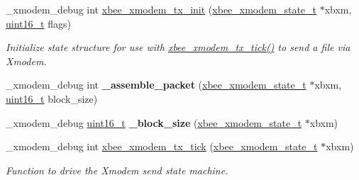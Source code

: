 \begin{DoxyCompactItemize}
\item 
\-\_\-xmodem\-\_\-debug int \hyperlink{group__util__xmodem_gabc8da474bce7043eef3537bd492c5123}{xbee\-\_\-xmodem\-\_\-tx\-\_\-init} (\hyperlink{structxbee__xmodem__state__t}{xbee\-\_\-xmodem\-\_\-state\-\_\-t} $\ast$xbxm, \hyperlink{group__hal_ga5a8b2dc9e45a9ee81a94ef304fb62505}{uint16\-\_\-t} flags)
\begin{DoxyCompactList}\small\item\em Initialize state structure for use with \hyperlink{group__util__xmodem_ga1de6d8cc3628767d877e854f92ab2b0e}{xbee\-\_\-xmodem\-\_\-tx\-\_\-tick()} to send a file via Xmodem. \end{DoxyCompactList}\item 
\hypertarget{group__util__xmodem_ga96fca6132d78345b4a3c20f89971aede}{\-\_\-xmodem\-\_\-debug int {\bfseries \-\_\-assemble\-\_\-packet} (\hyperlink{structxbee__xmodem__state__t}{xbee\-\_\-xmodem\-\_\-state\-\_\-t} $\ast$xbxm, \hyperlink{group__hal_ga5a8b2dc9e45a9ee81a94ef304fb62505}{uint16\-\_\-t} block\-\_\-size)}\label{group__util__xmodem_ga96fca6132d78345b4a3c20f89971aede}

\item 
\hypertarget{group__util__xmodem_gab3bb5db3c60870f771cae1268fa24eb4}{\-\_\-xmodem\-\_\-debug \hyperlink{group__hal_ga5a8b2dc9e45a9ee81a94ef304fb62505}{uint16\-\_\-t} {\bfseries \-\_\-block\-\_\-size} (\hyperlink{structxbee__xmodem__state__t}{xbee\-\_\-xmodem\-\_\-state\-\_\-t} $\ast$xbxm)}\label{group__util__xmodem_gab3bb5db3c60870f771cae1268fa24eb4}

\item 
\-\_\-xmodem\-\_\-debug int \hyperlink{group__util__xmodem_ga1de6d8cc3628767d877e854f92ab2b0e}{xbee\-\_\-xmodem\-\_\-tx\-\_\-tick} (\hyperlink{structxbee__xmodem__state__t}{xbee\-\_\-xmodem\-\_\-state\-\_\-t} $\ast$xbxm)
\begin{DoxyCompactList}\small\item\em Function to drive the Xmodem send state machine. \end{DoxyCompactList}\end{DoxyCompactItemize}
